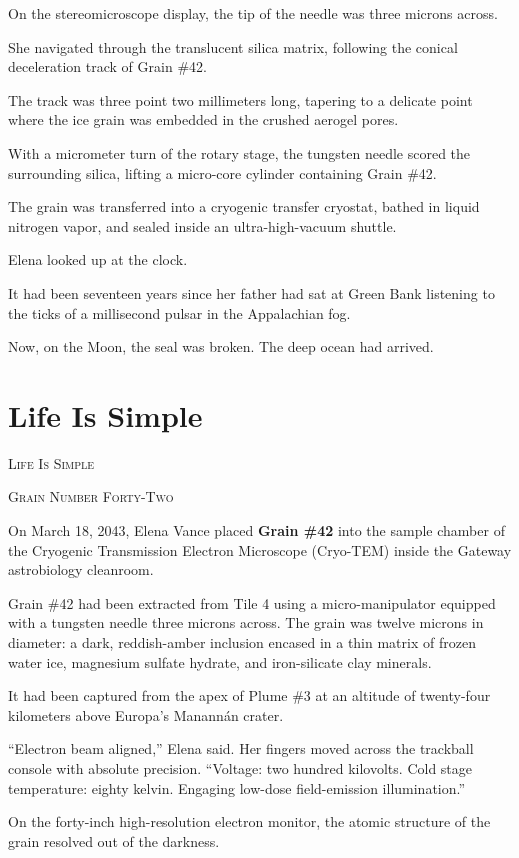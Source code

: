 \documentclass[12pt,twoside,openright]{book}
\newcommand{\sceneheader}[1]{%
  \par\vspace{1.8em}%
  {\noindent\centering\scshape\large #1\par}%
  \vspace{1.0em}%
  \noindent%
}
\begin{document}
On the stereomicroscope display, the tip of the needle was three microns
across.

She navigated through the translucent silica matrix, following the
conical deceleration track of Grain \#42.

The track was three point two millimeters long, tapering to a delicate
point where the ice grain was embedded in the crushed aerogel pores.

With a micrometer turn of the rotary stage, the tungsten needle scored
the surrounding silica, lifting a micro-core cylinder containing Grain
\#42.

The grain was transferred into a cryogenic transfer cryostat, bathed in
liquid nitrogen vapor, and sealed inside an ultra-high-vacuum shuttle.

Elena looked up at the clock.

It had been seventeen years since her father had sat at Green Bank
listening to the ticks of a millisecond pulsar in the Appalachian fog.

Now, on the Moon, the seal was broken. The deep ocean had arrived.

\chapter{Life Is Simple}
\sceneheader{Life Is Simple}

\sceneheader{Grain Number Forty-Two}

On March 18, 2043, Elena Vance placed \textbf{Grain \#42} into the
sample chamber of the Cryogenic Transmission Electron Microscope
(Cryo-TEM) inside the Gateway astrobiology cleanroom.

Grain \#42 had been extracted from Tile 4 using a micro-manipulator
equipped with a tungsten needle three microns across. The grain was
twelve microns in diameter: a dark, reddish-amber inclusion encased in a
thin matrix of frozen water ice, magnesium sulfate hydrate, and
iron-silicate clay minerals.

It had been captured from the apex of Plume \#3 at an altitude of
twenty-four kilometers above Europa's Manannán crater.

``Electron beam aligned,'' Elena said. Her fingers moved across the
trackball console with absolute precision. ``Voltage: two hundred
kilovolts. Cold stage temperature: eighty kelvin. Engaging low-dose
field-emission illumination.''

On the forty-inch high-resolution electron monitor, the atomic structure
of the grain resolved out of the darkness.
\end{document}
